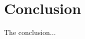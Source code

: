 \documentclass[../main.tex]{subfiles}
\begin{document}
\section{Conclusion}
\justify
The conclusion...
\end{document}

